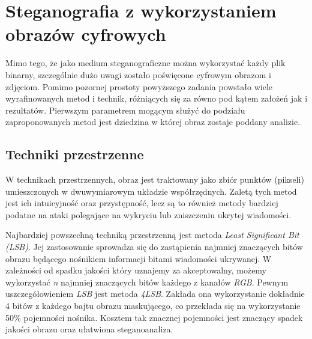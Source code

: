 {    \section{Steganografia z wykorzystaniem obrazów cyfrowych}
    {
        Mimo tego, że jako medium steganograficzne można wykorzystać każdy plik binarny, szczególnie dużo uwagi zostało
        poświęcone cyfrowym obrazom i zdjęciom. Pomimo pozornej prostoty powyższego zadania powstało wiele
        wyrafinowanych metod i technik, różniących się za równo pod kątem założeń jak i rezultatów. Pierwszym parametrem
        mogącym służyć do podziału zaproponowanych metod jest dziedzina w której  obraz zostaje poddany analizie.

        \subsection{Techniki przestrzenne}
        {
            W technikach przestrzennych, obraz jest traktowany jako zbiór punktów (pikseli) umieszczonych w
            dwuwymiarowym układzie współrzędnych. Zaletą tych metod jest ich intuicyjność oraz przystępność, lecz są to
            również metody bardziej podatne na ataki polegające na wykryciu lub zniszczeniu ukrytej
            wiadomości\cite{Sharma2020AnIS}.

            Najbardziej powszechną techniką przestrzenną jest metoda \textit{Least Significant Bit (LSB)}. Jej
            zastosowanie  sprowadza się do zastąpienia najmniej znaczących bitów obrazu będącego nośnikiem informacji
            bitami wiadomości  ukrywanej. W zależności od spadku jakości który uznajemy za akceptowalny, możemy
            wykorzystać \textit{n} najmniej  znaczących bitów każdego z kanałów \textit{RGB}. Pewnym uszczegółowieniem
            \textit{LSB} jest metoda  \textit{4LSB}. Zakłada ona wykorzystanie dokładnie 4 bitów z każdego bajtu obrazu
            maskującego, co przekłada się  na wykorzystanie 50\% pojemności nośnika. Kosztem tak znacznej pojemności
            jest znaczący spadek jakości obrazu  oraz ułatwiona steganoanaliza.

}}}
